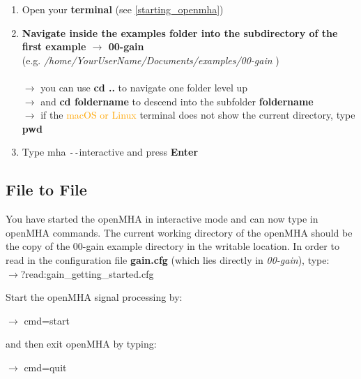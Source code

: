 \documentclass[11pt,a4paper,twoside]{article}
\newcommand{\+}{\discretionary{\mbox{\scriptsize$\hookleftarrow$}}{}{}}
\begin{document}
{{\begin{enumerate}
    
    \item Open your \textbf{terminal} (see \ref{starting_openmha})
    \item \textbf{Navigate inside the examples folder into the subdirectory of the first example $\rightarrow$ \textbf{00-gain}} \\ (e.g. \textit{/home/YourUserName/Documents/examples/00-gain} )\\ \\
    $\rightarrow$ you can use \textbf{cd ..} to navigate one folder level up \\
    $\rightarrow$ and \textbf{cd foldername} to descend into the subfolder
      \textbf{foldername}\\
    $\rightarrow$ if the \textcolor{orange}{macOS or Linux} terminal does not show the current directory, type \textbf{pwd} \\
    \item Type {{\ttfamily mha \texttt{-{}-}interactive}} and press \textbf{Enter}
\end{enumerate}

\subsection{File to File}

You have started the openMHA in interactive mode and can now type in openMHA commands.
The current working directory of the openMHA should be the copy of the 00-gain example directory in the writable location.
In order to read in the configuration file \textbf{gain.cfg} (which lies directly in \textit{00-gain}), type: \\

$\rightarrow${\ttfamily ?read:gain\_getting\_started.cfg}


Start the openMHA signal processing by:

$\rightarrow$ {\ttfamily cmd=start}

and then exit openMHA by typing:

$\rightarrow$ {\ttfamily cmd=quit} 
\\

}}
\end{document}
